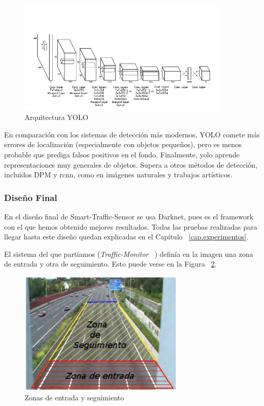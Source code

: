 \begin{figure}
\begin{center}
	\includegraphics[width=0.9\textwidth]{figures/Diseno_global/yolov3.png}
   \caption{Arquitectura YOLO}
	\label{fig.yolov3}
\end{center}
\end{figure}

En comparación con los sistemas de detección más modernos, YOLO comete más errores de localización (especialmente con objetos pequeños), pero es menos probable que prediga falsos positivos en el fondo. Finalmente, \acrshort{yolo} aprende representaciones muy generales de objetos. Supera a otros métodos de detección, incluidos DPM y \acrshort{rcnn}, como en imágenes naturales y trabajos artísticos.

\subsubsection{Diseño Final}

En el diseño final de Smart-Traffic-Sensor se usa Darknet, pues es el framework con el que hemos obtenido mejores resultados. Todas las pruebas realizadas para llegar hasta este diseño quedan explicadas en el Capítulo ~\ref{cap.experimentos}.

El sistema del que partíamos (\textit{Traffic-Monitor} ~\cite{traffic_monitor_redo}) definía en la imagen una zona de entrada y otra de seguimiento. Esto puede verse en la Figura ~\ref{fig.zonas}.

\begin{figure}
\begin{center}
	\includegraphics[width=0.7\textwidth]{figures/Diseno_global/zonas.png}
   \caption{Zonas de entrada y seguimiento}
	\label{fig.zonas}
\end{center}
\end{figure}


